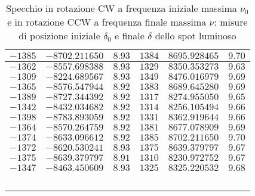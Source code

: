 \documentclass[]{article}
\begin{document}
\begin{table}
\begin{tabular}{||c|c|c||c|c|c||}
        $-1385$ & $-8702.211650 $ & $8.93$ & $1384$ & $8695.928465$ & $9.70$\\\hline
        $-1362$ & $-8557.698388 $ & $8.93$ & $1329$ & $8350.353273$ & $9.63$\\\hline
        $-1309$ & $-8224.689567 $ & $8.93$ & $1349$ & $8476.016979$ & $9.69$\\\hline
        $-1365$ & $-8576.547944 $ & $8.92$ & $1383$ & $8689.645280$ & $9.69$\\\hline
        $-1389$ & $-8727.344392 $ & $8.92$ & $1317$ & $8274.955050$ & $9.65$\\\hline
        $-1342$ & $-8432.034682 $ & $8.92$ & $1314$ & $8256.105494$ & $9.66$\\\hline
        $-1398$ & $-8783.893059 $ & $8.92$ & $1331$ & $8362.919644$ & $9.66$\\\hline
        $-1364$ & $-8570.264759 $ & $8.92$ & $1381$ & $8677.078909$ & $9.69$\\\hline
        $-1374$ & $-8633.096612 $ & $8.92$ & $1385$ & $8702.211650$ & $9.70$\\\hline
        $-1372$ & $-8620.530241 $ & $8.93$ & $1375$ & $8639.379797$ & $9.67$\\\hline
        $-1375$ & $-8639.379797 $ & $8.91$ & $1310$ & $8230.972752$ & $9.67$\\\hline
        $-1347$ & $-8463.450609 $ & $8.93$ & $1325$ & $8325.220532$ & $9.68$\\\hline
    \end{tabular}
    \caption{Specchio in rotazione CW a frequenza iniziale massima $\nu_0$ e in rotazione CCW a frequenza finale massima $\nu$: misure di posizione iniziale $\delta_0$ e finale $\delta$ dello spot luminoso}
    \label{CW_CCW}
\end{table}
\end{document}
